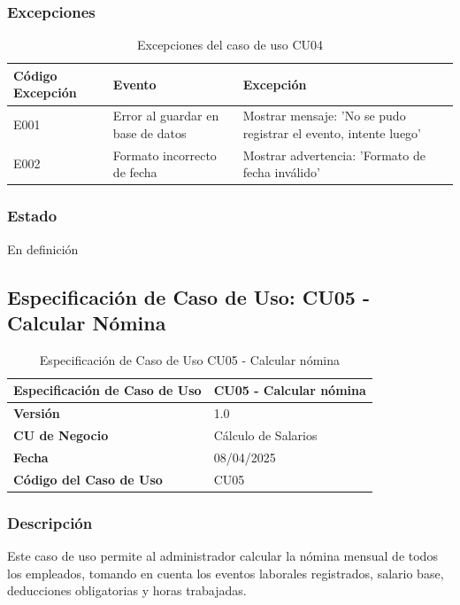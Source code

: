 \subsubsection*{Excepciones}
\begin{table}[h]
	\centering
	\caption{Excepciones del caso de uso CU04}
	\begin{tabular}{|p{3cm}|p{5cm}|p{5cm}|}
		\hline
		\textbf{Código Excepción} & \textbf{Evento}                   & \textbf{Excepción}                                               \\ \hline
		E001                      & Error al guardar en base de datos & Mostrar mensaje: 'No se pudo registrar el evento, intente luego' \\ \hline
		E002                      & Formato incorrecto de fecha       & Mostrar advertencia: 'Formato de fecha inválido'                 \\ \hline
	\end{tabular}
\end{table}

\newpage

\subsubsection*{Estado}
En definición

\subsection*{Especificación de Caso de Uso: CU05 - Calcular Nómina}

\begin{table}[h]
	\centering
	\caption{Especificación de Caso de Uso CU05 - Calcular nómina}
	\begin{tabular}{|p{5cm}|p{9cm}|}
		\hline
		\textbf{Especificación de Caso de Uso} & CU05 - Calcular nómina \\ \hline
		\textbf{Versión}                       & 1.0                    \\ \hline
		\textbf{CU de Negocio}                 & Cálculo de Salarios    \\ \hline
		\textbf{Fecha}                         & 08/04/2025             \\ \hline
		\textbf{Código del Caso de Uso}        & CU05                   \\ \hline
	\end{tabular}
\end{table}

\subsubsection*{Descripción}
Este caso de uso permite al administrador calcular la nómina mensual de todos los empleados, tomando en cuenta los eventos laborales registrados, salario base, deducciones obligatorias y horas trabajadas.

